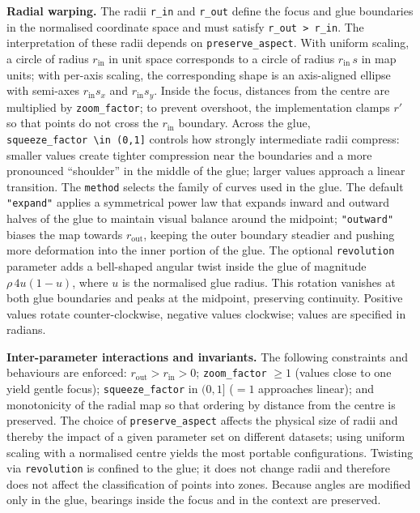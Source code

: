 \textbf{Radial warping.} The radii \texttt{r\_in} and \texttt{r\_out} define the focus and glue boundaries
in the normalised coordinate space and must satisfy \texttt{r\_out\ \textgreater{}\ r\_in}. The interpretation of these
radii depends on \texttt{preserve\_aspect}. With uniform scaling, a circle of radius \(r_{\text{in}}\)
in unit space corresponds to a circle of radius \(r_{\text{in}}\,s\) in map units; with per-axis
scaling, the corresponding shape is an axis-aligned ellipse with semi-axes \(r_{\text{in}}s_x\) and
\(r_{\text{in}}s_y\). Inside the focus, distances from the centre are multiplied by
\texttt{zoom\_factor}; to prevent overshoot, the implementation clamps \(r'\) so that points do not cross
the \(r_{\text{in}}\) boundary. Across the glue, \texttt{squeeze\_factor\ \textbackslash{}in\ (0,1{]}} controls how strongly
intermediate radii compress: smaller values create tighter compression near the boundaries and a
more pronounced ``shoulder'' in the middle of the glue; larger values approach a linear transition. The
\texttt{method} selects the family of curves used in the glue. The default \texttt{"expand"} applies a
symmetrical power law that expands inward and outward halves of the glue to maintain visual balance
around the midpoint; \texttt{"outward"} biases the map towards \(r_{\text{out}}\), keeping the outer
boundary steadier and pushing more deformation into the inner portion of the glue. The optional
\texttt{revolution} parameter adds a bell-shaped angular twist inside the glue of magnitude
\(\rho\,4u(1-u)\), where \(u\) is the normalised glue radius. This rotation vanishes at both glue
boundaries and peaks at the midpoint, preserving continuity. Positive values rotate
counter-clockwise, negative values clockwise; values are specified in radians.

\textbf{Inter-parameter interactions and invariants.} The following constraints and behaviours are
enforced: \(r_{\text{out}} > r_{\text{in}} > 0\); \texttt{zoom\_factor} \(\ge 1\) (values close to one
yield gentle focus); \texttt{squeeze\_factor} in \((0,1]\) (\(=1\) approaches linear); and monotonicity of
the radial map so that ordering by distance from the centre is preserved. The choice of
\texttt{preserve\_aspect} affects the physical size of radii and thereby the impact of a given parameter
set on different datasets; using uniform scaling with a normalised centre yields the most portable
configurations. Twisting via \texttt{revolution} is confined to the glue; it does not change radii and
therefore does not affect the classification of points into zones. Because angles are modified only
in the glue, bearings inside the focus and in the context are preserved.

